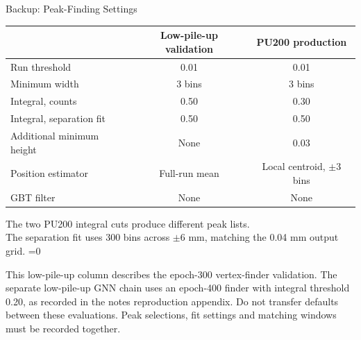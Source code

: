 \documentclass[xcolor=table,aspectratio=169]{beamer}
\providecommand{\talkbuild}{0}
\newcommand{\readingonly}[1]{\ifnum\talkbuild=0\relax#1\fi}
\newcommand{\readingnote}[1]{\readingonly{\par\vspace{.35em}%
  {\footnotesize\color{black!65}#1\par}}}
\begin{document}
\begin{frame}{Backup: Peak-Finding Settings}
\relax

\centering\small
\begin{tabular}{lcc}\toprule
 & Low-pile-up validation & PU200 production\\\midrule
Run threshold & 0.01 & 0.01\\
Minimum width & 3 bins & 3 bins\\
Integral, counts & 0.50 & 0.30\\
Integral, separation fit & 0.50 & 0.50\\
Additional minimum height & None & 0.03\\
Position estimator & Full-run mean & Local centroid, $\pm3$ bins\\
GBT filter & None & None\\\bottomrule
\end{tabular}
\par\vspace{1em}\small
The two PU200 integral cuts produce different peak lists.\\[.5em]
The separation fit uses 300 bins across $\pm6$ mm, matching the 0.04 mm output grid.
\readingnote{This low-pile-up column describes the epoch-300 vertex-finder validation. The separate low-pile-up GNN chain uses an epoch-400 finder with integral threshold 0.20, as recorded in the note\textquotesingle s reproduction appendix. Do not transfer defaults between these evaluations. Peak selections, fit settings and matching windows must be recorded together.}
\end{frame}
\end{document}
